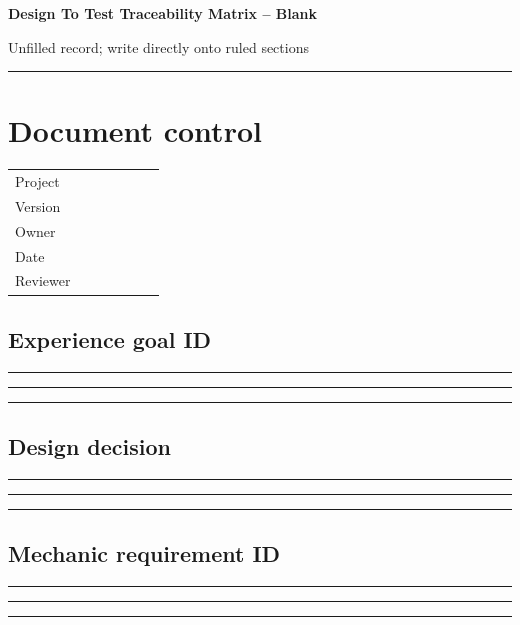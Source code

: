 \documentclass[11pt]{article}
\begin{document}
{\huge\bfseries\color{suiteblue} Design To Test Traceability Matrix -- Blank}\par
\vspace{0.15in}
{\normalsize\color{suitegray} Unfilled record; write directly onto ruled sections}\par
\vspace{0.15in}\hrule\vspace{0.15in}

\section{Document control}
\renewcommand{\arraystretch}{1.8}
\begin{tabularx}{\linewidth}{@{}p{0.30\linewidth}X@{}}\toprule
Project & \hrulefill\\ Version & \hrulefill\\ Owner & \hrulefill\\ Date & \hrulefill\\ Reviewer & \hrulefill\\ \bottomrule\end{tabularx}

\subsection{Experience goal ID}
\noindent\rule{\linewidth}{0.3pt}\par\vspace{0.18in}
\noindent\rule{\linewidth}{0.3pt}\par\vspace{0.18in}
\noindent\rule{\linewidth}{0.3pt}\par\vspace{0.14in}

\subsection{Design decision}
\noindent\rule{\linewidth}{0.3pt}\par\vspace{0.18in}
\noindent\rule{\linewidth}{0.3pt}\par\vspace{0.18in}
\noindent\rule{\linewidth}{0.3pt}\par\vspace{0.14in}

\subsection{Mechanic requirement ID}
\noindent\rule{\linewidth}{0.3pt}\par\vspace{0.18in}
\noindent\rule{\linewidth}{0.3pt}\par\vspace{0.18in}
\noindent\rule{\linewidth}{0.3pt}\par\vspace{0.14in}
\end{document}
